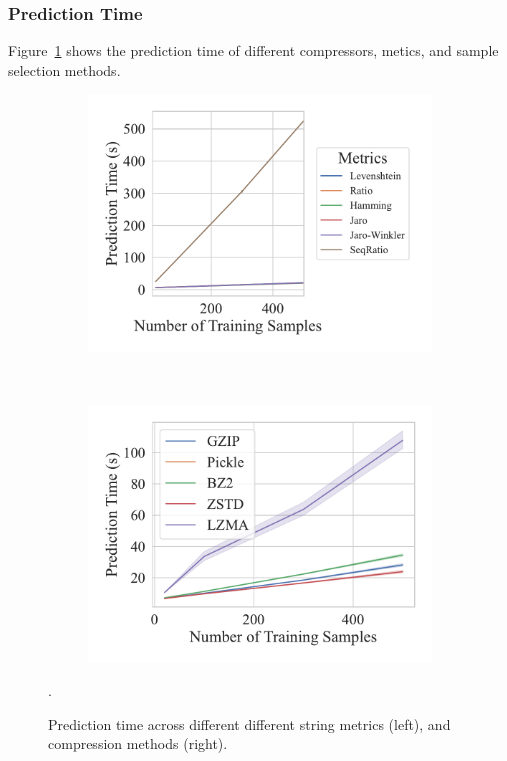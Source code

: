 \subsubsection{Prediction Time}

Figure~\ref{fig:ddos_prediction_time} shows the prediction time of different compressors, metics, and sample selection methods.
\begin{figure}[h!]
	\centering
    \captionsetup[subfigure]{skip=0pt}
	\begin{subfigure}[t]{.44\textwidth}
		\centering
		\includegraphics[width=\textwidth]{figs/ddos/string_metric_vs_predict_time.pdf}
	\end{subfigure}
	~
	\begin{subfigure}[t]{.44\textwidth}
		\centering
		\includegraphics[width=\textwidth]{figs/ddos/compressor_metric_vs_predict_time.pdf}
	\end{subfigure}
	\caption{Prediction time across different different string metrics (left), and compression methods (right).}.
	\label{fig:ddos_prediction_time}
 
\end{figure}

